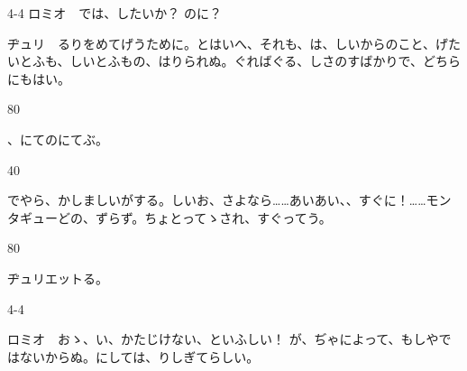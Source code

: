 \documentclass[tate,paper=b6j,jafontsize=9pt]{jlreq}
\begin{document}
\begin{azconvIndented}{4\zw}{-4\zw}
ロミオ　では、したいか？ のに？

ヂュリ　るりをめてげうために。とはいへ、それも、は、しいからのこと、げたいとふも、しいとふもの、はりられぬ。ぐればぐる、しさのすばかりで、どちらにもはい。

\end{azconvIndented}
\begin{azconvIndented}{8\zw}{0\zw}

、にてのにてぶ。

\end{azconvIndented}
\begin{azconvIndented}{4\zw}{0\zw}

でやら、かしましいがする。しいお、さよなら……あいあい、、すぐに！……モンタギューどの、ずらず。ちょとってゝされ、すぐってう。

\end{azconvIndented}
\begin{azconvIndented}{8\zw}{0\zw}

ヂュリエットる。

\end{azconvIndented}
\begin{azconvIndented}{4\zw}{-4\zw}

ロミオ　おゝ、い、かたじけない、といふしい！ が、ぢゃによって、もしやではないからぬ。にしては、りしぎてらしい。

\end{azconvIndented}
\end{document}

